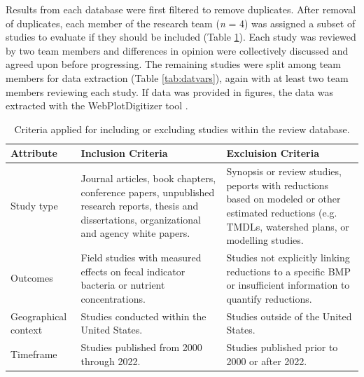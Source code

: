 \documentclass[utf8]{FrontiersinHarvard}
\begin{document}
Results from each database were first filtered to remove duplicates.
After removal of duplicates, each member of the research team (\emph{n} = 4) was assigned a subset of studies to evaluate if they should be included (Table \ref{tab:criteria}).
Each study was reviewed by two team members and differences in opinion were collectively discussed and agreed upon before progressing.
The remaining studies were split among team members for data extraction (Table \ref{tab:datvars}), again with at least two team members reviewing each study.
If data was provided in figures, the data was extracted with the WebPlotDigitizer tool \citep{rohatgiWebPlotDigitizer2022}.

\begin{table}

\caption{\label{tab:criteria}Criteria applied for including or excluding studies within the review database.}
\centering
\begin{tabular}[t]{>{\raggedright\arraybackslash}p{5em}>{\raggedright\arraybackslash}p{15em}>{\raggedright\arraybackslash}p{15em}}
\toprule
Attribute & Inclusion Criteria & Excluision Criteria\\
\midrule
Study type & Journal articles, book chapters, conference papers, unpublished research reports, thesis and dissertations, organizational and agency white papers. & Synopsis or review studies, peports with reductions based on modeled or other estimated reductions (e.g. TMDLs, watershed plans, or modelling studies.\\
Outcomes & Field studies with measured effects on fecal indicator bacteria or nutrient concentrations. & Studies not explicitly linking reductions to a specific BMP or insufficient information to quantify reductions.\\
Geographical context & Studies conducted within the United States. & Studies outside of the United States.\\
Timeframe & Studies published from 2000 through 2022. & Studies published prior to 2000 or after 2022.\\
\bottomrule
\end{tabular}
\end{table}
\end{document}
